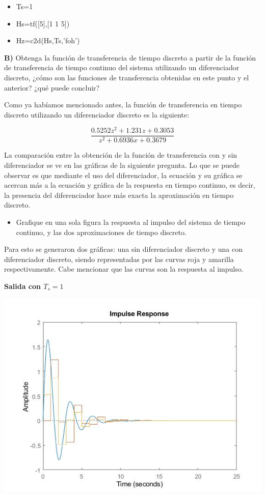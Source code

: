 \begin{itemize}
\item Ts=1
\item Hs=tf([5],[1 1 5])
\item Hz=c2d(Hs,Ts,'foh')
\end{itemize}

\textbf{B)}  Obtenga la función de transferencia de tiempo discreto a partir de la función de transferencia de tiempo continuo del sistema utilizando un diferenciador discreto, ¿cómo son las funciones de transferencia obtenidas en este punto y el anterior? ¿qué puede concluir?

Como ya habíamos mencionado antes, la función de transferencia en tiempo discreto utilizando un diferenciador discreto es la siguiente:

\begin{equation}
\frac{0.5252z^2+1.231z+0.3053}{z^2 +0.6936x + 0.3679}
\end{equation}

La comparación entre la obtención de la función de transferencia con y sin diferenciador se ve en las gráficas de la siguiente pregunta. Lo que se puede observar es que mediante el uso del diferenciador, la ecuación y su gráfica se acercan más a la ecuación y gráfica de la respuesta en tiempo continuo, es decir, la presencia del diferenciador hace más exacta la aproximación en tiempo discreto.

\begin{itemize}
	\item Grafique en una sola figura la respuesta al impulso del sistema de tiempo continuo, y las dos aproximaciones
	de tiempo discreto.
\end{itemize}

Para esto se generaron dos gráficas: una sin diferenciador discreto y una con diferenciador discreto, siendo representadas por las curvas roja y amarilla respectivamente. Cabe mencionar que las curvas son la respuesta al impulso.

\noindent \textbf{Salida con $T_s=1$}

\noindent \includegraphics[scale=0.6]{./img2/SalidaTs1DosHz}

